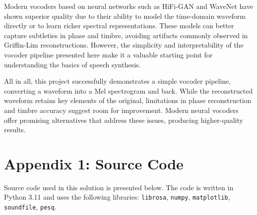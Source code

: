 \documentclass{article}
\begin{document}
Modern vocoders based on neural networks such as HiFi-GAN and WaveNet have shown superior quality due to their ability to model the time-domain waveform directly or to learn richer spectral representations. These models can better capture subtleties in phase and timbre, avoiding artifacts commonly observed in Griffin-Lim reconstructions. However, the simplicity and interpretability of the vocoder pipeline presented here make it a valuable starting point for understanding the basics of speech synthesis.

All in all, this project successfully demonstrates a simple vocoder pipeline, converting a waveform into a Mel spectrogram and back. While the reconstructed waveform retains key elements of the original, limitations in phase reconstruction and timbre accuracy suggest room for improvement. Modern neural vocoders offer promising alternatives that address these issues, producing higher-quality results.

\newpage

\section{Appendix 1: Source Code}

Source code used in this solution is presented below. The code is written in Python 3.11 and uses the following libraries: \texttt{librosa}, \texttt{numpy}, \texttt{matplotlib}, \texttt{soundfile}, \texttt{pesq}.
\end{document}
